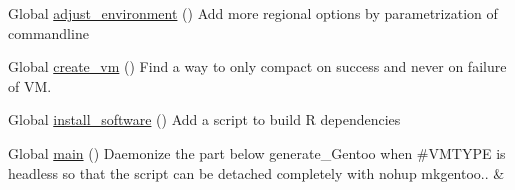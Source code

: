 
\begin{DoxyRefList}
\item[Global \mbox{\hyperlink{group__mk_file_system_gaa8c398850ee5921a441408b92f32d477}{adjust\+\_\+environment}} ()]\label{todo__todo000003}%
%
Add more regional options by parametrization of commandline  
\item[Global \mbox{\hyperlink{group__create_installer_ga629c1830d8dbae377193387edd199399}{create\+\_\+vm}} ()]\label{todo__todo000001}%
%
Find a way to only compact on success and never on failure of VM.  
\item[Global \mbox{\hyperlink{group__mk_file_system_gab693423f511d21225dbc60b2782190c3}{install\+\_\+software}} ()]\label{todo__todo000004}%
%
Add a script to build R dependencies  
\item[Global \mbox{\hyperlink{group__create_installer_ga51af30a60f9f02777c6396b8247e356f}{main}} ()]\label{todo__todo000002}%
%
Daemonize the part below generate\+\_\+\+Gentoo when \#\+V\+M\+T\+Y\+PE is {\ttfamily headless} so that the script can be detached completely with {\ttfamily nohup mkgentoo.. \&} 
\end{DoxyRefList}